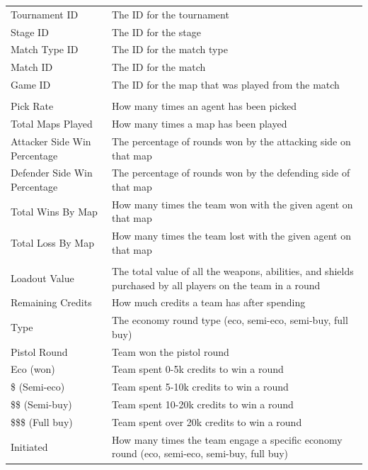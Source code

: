 \begin{longtable}{|>{\raggedright\arraybackslash}p{3cm}|p{12cm}|}
\multicolumn{2}{|c|}{\textbf{Tournament \& Match Information}} \\
\hline
Tournament ID & The ID for the tournament \\
\hline
Stage ID & The ID for the stage \\
\hline
Match Type ID & The ID for the match type \\
\hline
Match ID & The ID for the match \\
\hline
Game ID & The ID for the map that was played from the match \\
\hline
\multicolumn{2}{|c|}{\textbf{Agent \& Map Statistics}} \\
\hline
Pick Rate & How many times an agent has been picked \\
\hline
Total Maps Played & How many times a map has been played \\
\hline
Attacker Side Win Percentage & The percentage of rounds won by the attacking side on that map \\
\hline
Defender Side Win Percentage & The percentage of rounds won by the defending side of that map \\
\hline
Total Wins By Map & How many times the team won with the given agent on that map \\
\hline
Total Loss By Map & How many times the team lost with the given agent on that map \\
\hline
\multicolumn{2}{|c|}{\textbf{Economy Statistics}} \\
\hline
Loadout Value & The total value of all the weapons, abilities, and shields purchased by all players on the team in a round \\
\hline
Remaining Credits & How much credits a team has after spending \\
\hline
Type & The economy round type (eco, semi-eco, semi-buy, full buy) \\
\hline
Pistol Round & Team won the pistol round \\
\hline
Eco (won) & Team spent 0-5k credits to win a round \\
\hline
\$ (Semi-eco) & Team spent 5-10k credits to win a round \\
\hline
\$\$ (Semi-buy) & Team spent 10-20k credits to win a round \\
\hline
\$\$\$ (Full buy) & Team spent over 20k credits to win a round \\
\hline
Initiated & How many times the team engage a specific economy round (eco, semi-eco, semi-buy, full buy) \\

\end{longtable}
